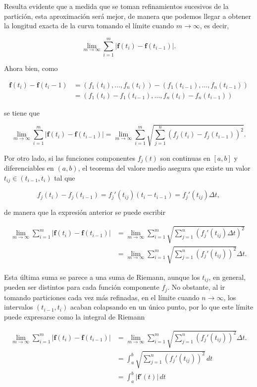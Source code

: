 \documentclass[
  a4paper,
]{scrreport}
\theoremstyle{plain}
\theoremstyle{plain}
\theoremstyle{definition}
\theoremstyle{definition}
\theoremstyle{plain}
\theoremstyle{remark}
\begin{document}
Resulta evidente que a medida que se toman refinamientos sucesivos de la
partición, esta aproximación será mejor, de manera que podemos llegar a
obtener la longitud exacta de la curva tomando el límite cuando
\(m\to\infty\), es decir,

\[
\lim_{m\to\infty}\sum_{i=1}^m |\mathbf{f}(t_i)-\mathbf{f}(t_{i-1})|.
\]

Ahora bien, como

\begin{align*}
\mathbf{f}(t_i)-\mathbf{f}(t_i-1) 
&= (f_1(t_i),\ldots,f_n(t_i))-(f_1(t_{i-1}),\ldots,f_n(t_{i-1})) \\
&= (f_1(t_i)-f_1(t_{i-1}),\ldots,f_n(t_i)-f_n(t_{i-1}))
\end{align*}

se tiene que

\[
\lim_{m\to\infty}\sum_{i=1}^m |\mathbf{f}(t_i)-\mathbf{f}(t_{i-1})| =
\lim_{m\to\infty}\sum_{i=1}^m \sqrt{\sum_{j=1}^n (f_j(t_i)-f_j(t_{i-1}))^2}.
\]

Por otro lado, si las funciones componentes \(f_j(t)\) son continuas en
\([a,b]\) y diferenciables en \((a,b)\), el teorema del valore medio
asegura que existe un valor \(t_{ij}\in(t_{i-1},t_i)\) tal que

\[
f_j(t_i)-f_j(t_{i-1}) = f_j'(t_{ij})(t_i-t_{i-1}) = f_j'(t_{ij}) \Delta t,
\]

de manera que la expresión anterior se puede escribir

\begin{align*}
\lim_{m\to\infty}\sum_{i=1}^m |\mathbf{f}(t_i)-\mathbf{f}(t_{i-1})| 
&= \lim_{m\to\infty}\sum_{i=1}^m \sqrt{\sum_{j=1}^n (f_j'(t_{ij})\Delta t)^2} \\
&= \lim_{m\to\infty}\sum_{i=1}^m \sqrt{\sum_{j=1}^n (f_j'(t_{ij}))^2}\Delta t.
\end{align*}

Esta última suma se parece a una suma de Riemann, aunque los \(t_{ij}\),
en general, pueden ser distintos para cada función componente \(f_j\).
No obstante, al ir tomando particiones cada vez más refinadas, en el
límite cuando \(n\to\infty\), los intervalos \((t_{i-1},t_i)\) acaban
colapsando en un único punto, por lo que este límite puede expresarse
como la integral de Riemann

\begin{align*}
\lim_{m\to\infty}\sum_{i=1}^m |\mathbf{f}(t_i)-\mathbf{f}(t_{i-1})| 
&= \lim_{m\to\infty}\sum_{i=1}^m \sqrt{\sum_{j=1}^n (f_j'(t_{ij}))^2}\Delta t. \\
&= \int_a^b \sqrt{\sum_{j=1}^n (f_j'(t_{ij}))^2}\, dt \\
&= \int_a^b |\mathbf{f}'(t)|\, dt
\end{align*}
\end{document}
